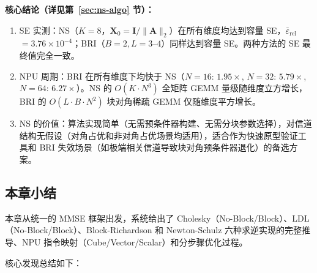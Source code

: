 \documentclass{CjC}
\begin{document}
    \textbf{核心结论（详见第~\ref{sec:ns-algo} 节）：}
    \begin{enumerate}
        \item SE 实测：NS（$K=8$，$\bm{X}_{0}=\bm{I}/\|\bm{A}\|_{2}$）在所有维度均达到容量
            SE，$\bar{\varepsilon}_{\text{rel}}$ $=3.76\times 10^{-4}$；BRI（$B=2,L=3$--$4$）同样达到容量
            SE。两种方法的 SE 最终值完全一致。

        \item NPU 周期：BRI 在所有维度下均快于 NS（$N=16$: $1.95\times$, $N=32$:
            $5.79\times$, $N=64$: $6.27\times$）。NS 的 $O(K\cdot N^{3})$ 全矩阵
            GEMM 量级随维度立方增长，BRI 的 $O(L\cdot B\cdot N^{2})$ 块对角稀疏
            GEMM 仅随维度平方增长。

        \item NS 的价值：算法实现简单（无需预条件器构建、无需分块参数选择），对信道结构无假设（对角占优和非对角占优场景均适用），适合作为快速原型验证工具和
            BRI 失效场景（如极端相关信道导致块对角预条件器退化）的备选方案。
    \end{enumerate}


    \subsection{本章小结}

    本章从统一的 MMSE 框架出发，系统给出了 Cholesky（No-Block/Block）、LDL（No-Block/Block）、Block-Richardson
    和 Newton-Schulz 六种求逆实现的完整推导、NPU 指令映射（Cube/Vector/Scalar）和分步骤优化过程。

    核心发现总结如下：
\end{document}
